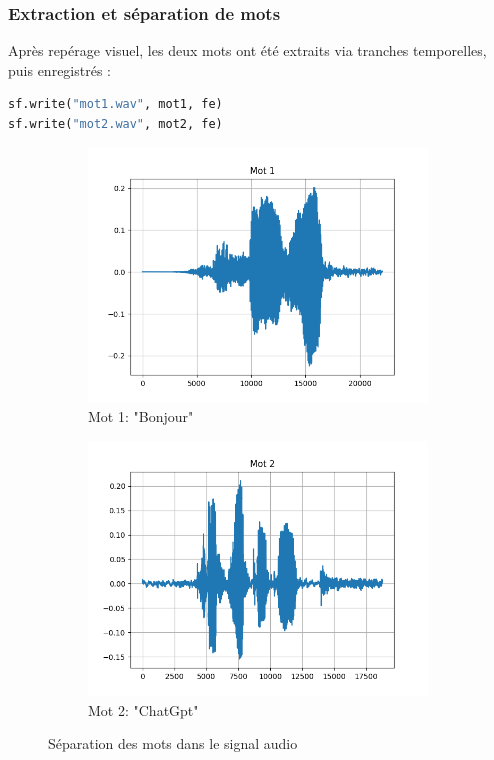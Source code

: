 \subsubsection{Extraction et séparation de mots}

Après repérage visuel, les deux mots ont été extraits via tranches temporelles, puis enregistrés :

\begin{lstlisting}[language=python]
sf.write("mot1.wav", mot1, fe)
sf.write("mot2.wav", mot2, fe)
\end{lstlisting}

\begin{figure}[h]
\centering
\begin{subfigure}[b]{0.45\textwidth}
    \centering
    \includegraphics[width=9cm]{screenshots/mot1_graphe.png}
    \caption{Mot 1: "Bonjour"}
\end{subfigure}
\hfill
\begin{subfigure}[b]{0.45\textwidth}
    \centering
    \includegraphics[width=9cm]{screenshots/mot2_graphe.png}
    \caption{Mot 2: "ChatGpt"}
\end{subfigure}
\caption{Séparation des mots dans le signal audio}
\end{figure}


